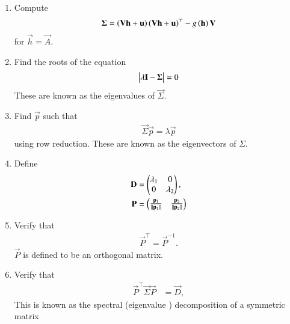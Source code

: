 \begin{enumerate}[label=\thesection.\arabic*.,ref=\thesection.\theenumi]
\item Compute 
\begin{align}
\mathbf{\Sigma} = 
\left(\mathbf{V}\mathbf{h}+\mathbf{u}\right)
	  \left(\mathbf{V}\mathbf{h}+\mathbf{u}\right)^{\top}
   -
	  {g}\left(\mathbf{h}\right)\mathbf{V}
\end{align}
for $\vec{h}=\vec{A}$.
\item Find the roots of the equation
\begin{align}
	\begin{vmatrix}\lambda \mathbf{I}-\mathbf{\Sigma}\end{vmatrix} = 0
\end{align}
These are known as the eigenvalues of $\vec{\Sigma}$.
\item Find $\vec{p}$  such that 
\begin{align}
	\vec{\Sigma}\vec{p}
	=\lambda\vec{p}
\end{align}
using row reduction.  These are known as the eigenvectors of $\Sigma$.
\item Define
    \begin{align}
      \label{eq:conic_parmas_eig_def-D}
      \vec{D} &= \myvec{\lambda_1 & 0\\ 0 & \lambda_2}, 
      \\
	    \vec{P} &= \myvec{\frac{\vec{p}_1}{\norm{\vec{p}_1}} & \frac{\vec{p}_2}{\norm{\vec{p}_2}}}
      \label{eq:eigevecP}
    \end{align}
    \item Verify that
  \begin{align}
\vec{P}^{\top}=\vec{P}^{-1}.
  \label{eq:orth-mat}
  \end{align}
  $\vec{P}$ is defined to be an orthogonal matrix.
\item Verify that
    \begin{align}
      \label{eq:conic_parmas_eig_def}
      \vec{P}^{\top}\vec{\Sigma}\vec{P} &= \vec{D},
    \end{align} 
		This is known as the spectral (eigenvalue ) decomposition of a symmetric matrix 


\end{enumerate}
